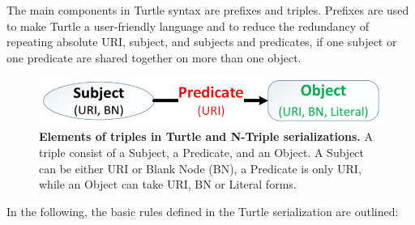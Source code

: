 The main components in Turtle syntax are prefixes and triples. 
Prefixes are used to make Turtle a user-friendly language and to reduce the redundancy of repeating absolute URI, subject, and subjects and predicates, if one subject or one predicate are shared together on more than one object. 

\begin{figure}[ht]
	\begin{center}
		\includegraphics[scale=0.4,angle=0]{images/TurtleandNtripleElements.png}
				\setlength\belowcaptionskip{-5mm}
		\caption{\textbf{ Elements of triples in Turtle and N-Triple serializations.} A triple consist of a Subject, a Predicate, and an Object. A Subject can be either URI or Blank Node (BN), a Predicate is only URI, while an Object can take URI, BN or Literal forms.}
		\label{Fig:TurtleandNtripleElements}
	\end{center}
\end{figure}

In the following, the basic rules defined in the Turtle serialization are outlined:

